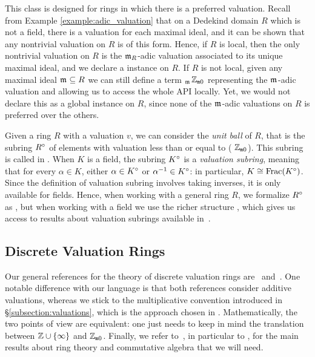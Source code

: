 \documentclass[sigplan,10pt,anonymous,review]{acmart}
\begin{document}
This class is designed for rings in which there is a preferred valuation. Recall from Example \ref{example:adic_valuation} that 
on a Dedekind domain $R$ which is not a field, there is a valuation for each maximal ideal, and it can be shown that any nontrivial valuation on $R$ is of this form. Hence, if $R$ is local, then the only nontrivial valuation on $R$ is the  $\mathfrak{m}_{R}$-adic valuation associated to its unique maximal ideal, and we declare a  instance on $R$. If $R$ is not local, given any maximal ideal $\maxid[\empty]\subseteq R$  we can still define a term $_{\maxid[\empty]}$\;$\mathbb{Z}_{\mathtt{m}0}$\code{)} representing the $\maxid[\empty]$-adic valuation and allowing us to access the whole  API locally. Yet, we would not declare this as a global  instance on $R$, since none of the $\maxid[\empty]$-adic valuations on $R$ is preferred over the others.

Given a ring $R$ with a valuation $v$, we can consider the \textit{unit ball} of $R$, that is the subring ${R}^\circ$ of elements with valuation less than or equal to ( $\mathbb{Z}_{\mathtt{m}0}$). This subring is called \href{https://leanprover-community.github.io/mathlib_docs/ring_theory/valuation/integers.html#valuation.integer}{\extlink} in \mathlib. 
When $K$ is a field, the subring ${K}^\circ$ is a \emph{valuation subring}, meaning that for every $\alpha\in K$, either $\alpha \in {K}^\circ$ or $\alpha^{-1} \in {K}^\circ$: in particular, $K\cong\operatorname{Frac}({K}^\circ)$. Since the definition of valuation subring involves taking inverses, it is only available for fields. Hence, when working with a general ring $R$, we formalize ${R}^\circ$ as , but when working with a field we use the richer structure \href{https://leanprover-community.github.io/mathlib_docs/ring_theory/valuation/valuation_subring.html#valuation_subring}{\extlink}, which gives us access to results about valuation subrings available in~\mathlib. 

\subsection{Discrete Valuation Rings}\label{subsection:def_dvr}

Our general references for the theory of discrete valuation rings are~\cite[Chapitres~I--II]{Ser62} and~\cite[Chapitre~VI]{Bou85}. One notable difference with our language is that both references consider additive valuations, whereas we stick to the multiplicative convention introduced in \S\ref{subsection:valuations}, which is the approach chosen in \mathlib. 
Mathematically, the two points of view are equivalent: one just needs to keep in mind the translation between $\mathbb{Z} \cup \{\infty\}$ and $\mathbb{Z}_{\mathtt{m}0}$. Finally, we refer to~\cite{Bou07}, in particular to \cite[Chapitre~IV]{Bou07}, for the main results about ring theory and commutative algebra that we will need.
\end{document}
